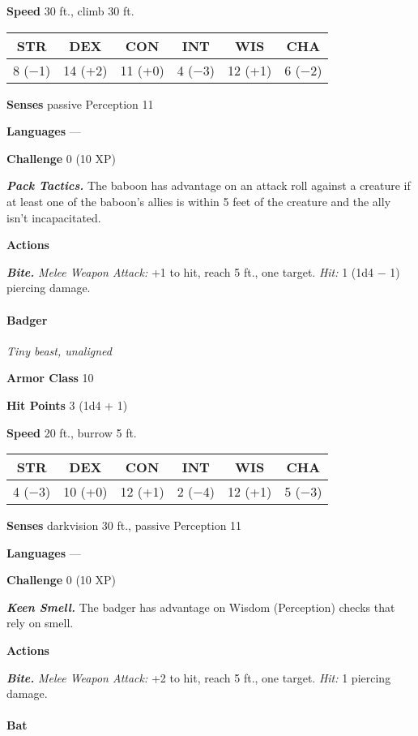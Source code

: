 \documentclass[
]{article}
\begin{document}
\textbf{Speed} 30 ft., climb 30 ft.

\begin{longtable}[]{@{}cccccc@{}}
\toprule
STR & DEX & CON & INT & WIS & CHA\tabularnewline
\midrule
\endhead
8 (−1) & 14 (+2) & 11 (+0) & 4 (−3) & 12 (+1) & 6 (−2)\tabularnewline
\bottomrule
\end{longtable}

\textbf{Senses} passive Perception 11

\textbf{Languages} ---

\textbf{Challenge} 0 (10 XP)

\emph{\textbf{Pack Tactics.}} The baboon has advantage on an attack roll
against a creature if at least one of the baboon's allies is within 5
feet of the creature and the ally isn't incapacitated.

\textbf{Actions}

\emph{\textbf{Bite.}} \emph{Melee Weapon Attack:} +1 to hit, reach 5
ft., one target. \emph{Hit:} 1 (1d4 − 1) piercing damage.

\hypertarget{badger}{%
\paragraph{Badger}\label{badger}}

\emph{Tiny beast, unaligned}

\textbf{Armor Class} 10

\textbf{Hit Points} 3 (1d4 + 1)

\textbf{Speed} 20 ft., burrow 5 ft.

\begin{longtable}[]{@{}cccccc@{}}
\toprule
STR & DEX & CON & INT & WIS & CHA\tabularnewline
\midrule
\endhead
4 (−3) & 10 (+0) & 12 (+1) & 2 (−4) & 12 (+1) & 5 (−3)\tabularnewline
\bottomrule
\end{longtable}

\textbf{Senses} darkvision 30 ft., passive Perception 11

\textbf{Languages} ---

\textbf{Challenge} 0 (10 XP)

\emph{\textbf{Keen Smell.}} The badger has advantage on Wisdom
(Perception) checks that rely on smell.

\textbf{Actions}

\emph{\textbf{Bite.}} \emph{Melee Weapon Attack:} +2 to hit, reach 5
ft., one target. \emph{Hit:} 1 piercing damage.

\hypertarget{bat}{%
\paragraph{Bat}\label{bat}}
\end{document}

